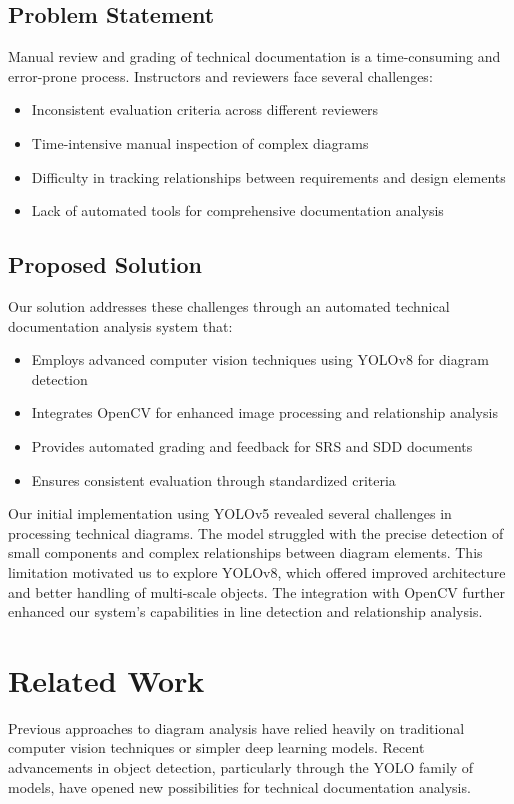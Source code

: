 \documentclass[conference]{IEEEtran}
\begin{document}
\subsection{Problem Statement}
Manual review and grading of technical documentation is a time-consuming and error-prone process. Instructors and reviewers face several challenges:
\begin{itemize}
\item Inconsistent evaluation criteria across different reviewers
\item Time-intensive manual inspection of complex diagrams
\item Difficulty in tracking relationships between requirements and design elements
\item Lack of automated tools for comprehensive documentation analysis
\end{itemize}

\subsection{Proposed Solution}
Our solution addresses these challenges through an automated technical documentation analysis system that:
\begin{itemize}
\item Employs advanced computer vision techniques using YOLOv8 for diagram detection
\item Integrates OpenCV for enhanced image processing and relationship analysis
\item Provides automated grading and feedback for SRS and SDD documents
\item Ensures consistent evaluation through standardized criteria
\end{itemize}

Our initial implementation using YOLOv5 revealed several challenges in processing technical diagrams. The model struggled with the precise detection of small components and complex relationships between diagram elements. This limitation motivated us to explore YOLOv8, which offered improved architecture and better handling of multi-scale objects. The integration with OpenCV further enhanced our system's capabilities in line detection and relationship analysis.

\section{Related Work}
Previous approaches to diagram analysis have relied heavily on traditional computer vision techniques or simpler deep learning models. Recent advancements in object detection, particularly through the YOLO family of models, have opened new possibilities for technical documentation analysis.
\end{document}
